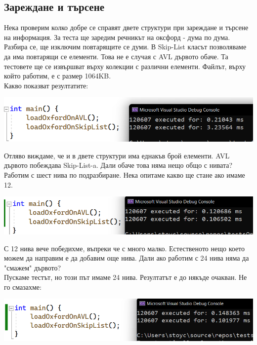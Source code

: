 \documentclass[a4paper,12pt,fleqn]{article}
\begin{document}
	\subsection{Зареждане и търсене}
	Нека проверим колко добре се справят двете структури при зареждане и търсене на информация. За теста ще заредим речникът на оксфорд - дума по дума. Разбира се, ще изключим повтарящите се думи. В Skip-List класът позволяваме да има повтарящи се елементи. Това не е случая с AVL дървото обаче. Та тестовете ще се извършват върху колекции с различни елементи. Файлът, върху който работим, е с размер 1064KB.\\
	Какво показват резултатите:\\
	\begin{center}
	\includegraphics[scale=0.4]{oxford-load.png}\\
	\end{center}
	Отляво виждаме, че и в двете структури има еднакъв брой елементи. AVL дървото побеждава Skip-List-a. Дали обаче това няма нещо общо с нивата? Работим с шест нива по подразбиране. Нека опитаме какво ще стане ако имаме 12.\\
	\begin{center}
	\includegraphics[scale=0.4]{oxford-load-2.png}\\
	\end{center}
	С 12 нива вече победихме, въпреки че с много малко. Естественото нещо което можем да направим е да добавим още нива. Дали ако работим с 24 нива няма да "смажем" дървото?\\
	Пускаме тестът, но този път имаме 24 нива. Резултатът е до някъде очакван. Не го смазахме:\\
	\begin{center}
	\includegraphics[scale=0.4]{oxford-load-3.png}\\
	\end{center}
\end{document}
